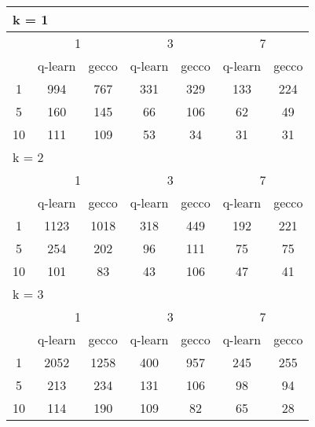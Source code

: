 \begin{table}
 \begin{tabular}{|*7{c|}}
\hline
\multicolumn{7}{|l|}{k = 1} \\
\hline
\multirow{2}{*}{\diagbox{$\mu$}{$\lambda$}} & \multicolumn{2}{c|}{1} & \multicolumn{2}{c|}{3} & \multicolumn{2}{c|}{7} \\
\cline{2-7}
 & q-learn & gecco & q-learn & gecco & q-learn & gecco \\
\hline
1 & 994 & 767 & 331 & 329 & 133 & 224 \\
\hline
5 & 160 & 145 & 66 & 106 & 62 & 49 \\
\hline
10 & 111 & 109 & 53 & 34 & 31 & 31 \\
\hline
\multicolumn{7}{|l|}{k = 2} \\
\hline
\multirow{2}{*}{\diagbox{$\mu$}{$\lambda$}} & \multicolumn{2}{c|}{1} & \multicolumn{2}{c|}{3} & \multicolumn{2}{c|}{7} \\
\cline{2-7}
 & q-learn & gecco & q-learn & gecco & q-learn & gecco \\
\hline
1 & 1123 & 1018 & 318 & 449 & 192 & 221 \\
\hline
5 & 254 & 202 & 96 & 111 & 75 & 75 \\
\hline
10 & 101 & 83 & 43 & 106 & 47 & 41 \\
\hline
\multicolumn{7}{|l|}{k = 3} \\
\hline
\multirow{2}{*}{\diagbox{$\mu$}{$\lambda$}} & \multicolumn{2}{c|}{1} & \multicolumn{2}{c|}{3} & \multicolumn{2}{c|}{7} \\
\cline{2-7}
 & q-learn & gecco & q-learn & gecco & q-learn & gecco \\
\hline
1 & 2052 & 1258 & 400 & 957 & 245 & 255 \\
\hline
5 & 213 & 234 & 131 & 106 & 98 & 94 \\
\hline
10 & 114 & 190 & 109 & 82 & 65 & 28 \\
\hline
\end{tabular}
\end{table}

